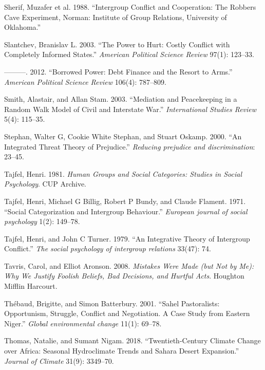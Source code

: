 \documentclass[11pt]{article}
\begin{document}
\leavevmode\hypertarget{ref-sherif1988robbersCave}{}%
Sherif, Muzafer et al. 1988. ``Intergroup Conflict and Cooperation: The
Robbers Cave Experiment, Norman: Institute of Group Relations,
University of Oklahoma.''

\leavevmode\hypertarget{ref-slantchev2003power}{}%
Slantchev, Branislav L. 2003. ``The Power to Hurt: Costly Conflict with
Completely Informed States.'' \emph{American Political Science Review}
97(1): 123--33.

\leavevmode\hypertarget{ref-slantchev2012borrowed}{}%
---------. 2012. ``Borrowed Power: Debt Finance and the Resort to
Arms.'' \emph{American Political Science Review} 106(4): 787--809.

\leavevmode\hypertarget{ref-smith2003mediation}{}%
Smith, Alastair, and Allan Stam. 2003. ``Mediation and Peacekeeping in a
Random Walk Model of Civil and Interstate War.'' \emph{International
Studies Review} 5(4): 115--35.

\leavevmode\hypertarget{ref-Stephan2000integratedThreat}{}%
Stephan, Walter G, Cookie White Stephan, and Stuart Oskamp. 2000. ``An
Integrated Threat Theory of Prejudice.'' \emph{Reducing prejudice and
discrimination}: 23--45.

\leavevmode\hypertarget{ref-tajfel1981groups}{}%
Tajfel, Henri. 1981. \emph{Human Groups and Social Categories: Studies
in Social Psychology}. CUP Archive.

\leavevmode\hypertarget{ref-tajfel1971social}{}%
Tajfel, Henri, Michael G Billig, Robert P Bundy, and Claude Flament.
1971. ``Social Categorization and Intergroup Behaviour.'' \emph{European
journal of social psychology} 1(2): 149--78.

\leavevmode\hypertarget{ref-tajfel1979integrative}{}%
Tajfel, Henri, and John C Turner. 1979. ``An Integrative Theory of
Intergroup Conflict.'' \emph{The social psychology of intergroup
relations} 33(47): 74.

\leavevmode\hypertarget{ref-tavris2008mistakes}{}%
Tavris, Carol, and Elliot Aronson. 2008. \emph{Mistakes Were Made (but
Not by Me): Why We Justify Foolish Beliefs, Bad Decisions, and Hurtful
Acts}. Houghton Mifflin Harcourt.

\leavevmode\hypertarget{ref-thebaud2001sahel}{}%
Thébaud, Brigitte, and Simon Batterbury. 2001. ``Sahel Pastoralists:
Opportunism, Struggle, Conflict and Negotiation. A Case Study from
Eastern Niger.'' \emph{Global environmental change} 11(1): 69--78.

\leavevmode\hypertarget{ref-thomas2018sahara}{}%
Thomas, Natalie, and Sumant Nigam. 2018. ``Twentieth-Century Climate
Change over Africa: Seasonal Hydroclimate Trends and Sahara Desert
Expansion.'' \emph{Journal of Climate} 31(9): 3349--70.
\end{document}
